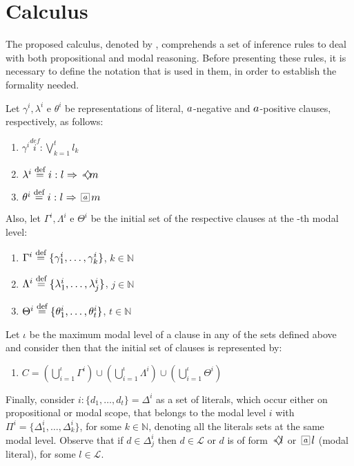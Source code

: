\section{Calculus}
\label{sec:calculus}

The proposed calculus, denoted by \ckn, comprehends a set of inference rules to
deal with both propositional and modal reasoning. Before presenting these rules,
it is necessary to define the notation that is used in them, in order to
establish the formality needed.

\begin{definition}
\label{def_conjuntos}
Let $\gamma^i, \lambda^i$ e $\theta^i$ be representations of 
literal, $\agent$-negative and $\agent$-positive clauses, respectively,
as follows:
\begin{enumerate}
\item $\gamma^i \stackrel{def} i : \bigvee^t_{k=1} l_k$
    \vspace{0.4em}
\item $\lambda^i \stackrel{def} i : l \then \pos{a}m$
    \vspace{0.4em}
\item $\theta^i \stackrel{def} i : l \then \nec{a}m$
\end{enumerate}

Also, let $\Gamma^i, \Lambda^i$ e $\Theta^i$ be the initial set of the  
respective clauses at the \ml-th modal level:
\begin{enumerate}
   \item $\Gamma^i \stackrel{def} \{\gamma_1^i, \ldots, \gamma_k^i\}$, $k \in \mathbb{N}$
    \vspace{0.4em}
   \item $\Lambda^i \stackrel{def} \{\lambda_1^i, \ldots, \lambda_j^i\}$, $j \in \mathbb{N}$
    \vspace{0.4em}
   \item $\Theta^i \stackrel{def} \{\theta_1^i, \ldots, \theta_t^i\}$, $t \in \mathbb{N}$
\end{enumerate}

Let $\iota$ be the maximum modal level of a clause in any of the sets defined
above and consider then that the initial set of clauses is represented by:
\begin{enumerate}
    \item $C = (\bigcup_{i=1}^{\iota} \Gamma^i) \cup (\bigcup_{i=1}^{\iota} \Lambda^i)
        \cup (\bigcup_{i=1}^{\iota} \Theta^i)$ 
\end{enumerate}

Finally, consider $i: \{d_1, \ldots, d_t\} = \Delta^i$ as a set of literals, which
occur either on propositional or modal scope, that belongs to the modal
level $i$ with $\Pi^i = \{\Delta^i_1, \ldots, \Delta^i_k\}$, for some $k \in
\mathbb{N}$, denoting all the literals sets at the same modal level. Observe
that if $d \in \Delta^i_j$ then $d \in \mathcal{L}$ or $d$ is of form
$\pos{a} l$ or $\nec{a} l$ (modal literal), for some $l \in \mathcal{L}$.  
\end{definition}

